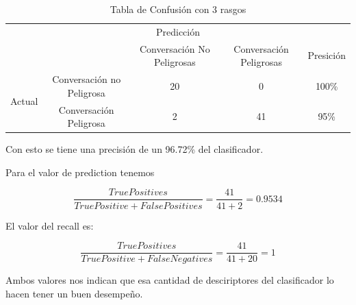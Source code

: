 \begin{table}[h]
\begin{center}
\begin{tabular}{c|c|c|c|c|}
\multicolumn{5}{c}{Predicci\'on} \\
\cline{2-5}
& & Conversaci\'on No Peligrosas & Conversaci\'on Peligrosas &  Presici\'on \\
\cline{2-5}
\multirow{2}{*}{Actual} & Conversaci\'on no Peligrosa & 20 & 0 & 100\% \\
\cline{2-5}
& Conversaci\'on Peligrosa &  2 & 41 & 95\% \\
\cline{2-5}

\end{tabular}
\caption{Tabla de Confusi\'on con 3 rasgos}
\label{tab:confucion2}
\end{center}
\end{table}

Con esto se tiene una precisi\'on de un 96.72\% del clasificador.


Para el valor de prediction tenemos 


\begin{equation}\label{eq:sigmoide}
\frac{TruePositives}{TruePositive + FalsePositives} = \frac{41}{41+2} = 0.9534
\end{equation} 

El valor del recall es: 

\begin{equation}\label{eq:sigmoide}
\frac{TruePositives}{TruePositive + FalseNegatives} = \frac{41}{41+2
0} = 1
\end{equation}

Ambos valores nos indican que esa cantidad de desciriptores del clasificador lo hacen tener un buen desempe\~no.



